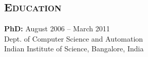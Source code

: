 \documentclass[margin,10pt]{res}
\begin{document}
\begin{resume}

\section{\textnormal{\textsc{Education}}}
\textbf{PhD:} \hfill August 2006 -- March 2011\\
Dept. of Computer Science and Automation\\
Indian Institute of Science, Bangalore, India\\ 


\end{resume}
\end{document}
